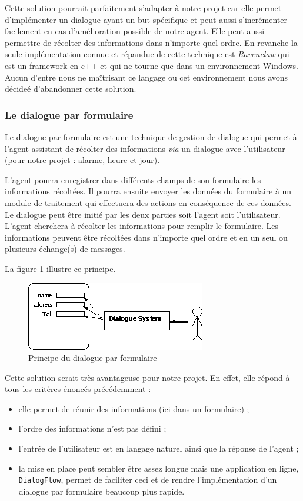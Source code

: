 \FloatBarrier

Cette solution pourrait parfaitement s'adapter à notre projet car elle permet d'implémenter un dialogue ayant un but spécifique et peut aussi s'incrémenter facilement en cas d'amélioration possible de notre agent. Elle peut aussi permettre de récolter des informations dans n'importe quel ordre. En revanche la seule implémentation connue et répandue de cette technique est \textit{Ravenclaw} qui est un framework en c++ et qui ne tourne que dans un environnement Windows. Aucun d'entre nous ne maîtrisant ce langage ou cet environnement nous avons décideé d'abandonner cette solution. 

\subsubsection{Le dialogue par formulaire}
Le dialogue par formulaire est une technique de gestion de dialogue qui permet à l'agent assistant de récolter des informations \emph{via} un dialogue avec l'utilisateur (pour notre projet : alarme, heure et jour). 

L'agent pourra enregistrer dans différents champs de son formulaire les informations récoltées. Il pourra ensuite envoyer les données du formulaire à un module de traitement qui effectuera des actions en conséquence de ces données. Le dialogue peut être initié par les deux parties soit l'agent soit l'utilisateur. L'agent cherchera à récolter les informations pour remplir le formulaire. Les informations peuvent être récoltées dans n'importe quel ordre et en un seul ou plusieurs échange(s) de messages.

La figure \ref{form-dialog} illustre ce principe.
\begin{figure}[H]
\centering
    \includegraphics[scale=0.7]{images/slot.png} %
    \caption{Principe du dialogue par formulaire}
    \label{form-dialog}
\end{figure}

Cette solution serait très avantageuse pour notre projet. 
En effet, elle répond à tous les critères énoncés précédemment : 
\begin{itemize}
    \item elle permet de réunir des informations (ici dans un formulaire) ;
    \item l'ordre des informations n'est pas défini ;
    \item l'entrée de l'utilisateur est en langage naturel ainsi que la réponse de l'agent ;
    \item la mise en place peut sembler être assez longue mais une application en ligne, \texttt{DialogFlow}, permet de faciliter ceci et de rendre l'implémentation d'un dialogue par formulaire beaucoup plus rapide.
\end{itemize}
\FloatBarrier


